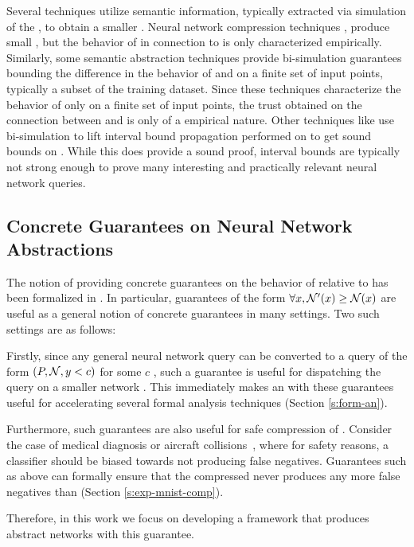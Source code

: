 Several techniques utilize semantic information, typically extracted via
simulation of the \dnn, to obtain a smaller \abs. 
Neural network compression techniques \cite{dnn-compression}, produce small
\abs, but the
behavior of \abs in connection to \cnc is only characterized empirically.
Similarly, some semantic abstraction techniques \cite{lin-comb-abs-jan} provide
bi-simulation guarantees bounding the difference in the behavior of \abs and
\cnc on a finite set of input points, typically a subset of the training
dataset. Since these techniques characterize the behavior of \abs only on a
finite set of
input points, the trust obtained on the connection between \cnc and \abs is only
of a empirical nature.
Other techniques like \cite{deep-abstract} use bi-simulation to lift
interval bound propagation performed on \abs to get sound bounds on \cnc. While
this does provide a sound proof, interval bounds are typically not strong enough
to prove many interesting and practically relevant neural network queries.

\subsection{Concrete Guarantees on Neural Network Abstractions}
\label{s:conc-abs}

The notion of providing concrete guarantees on the behavior of \abs relative to
\cnc has been formalized in \cite{cegar-nn}. In particular, guarantees of the
form $\forall x, \mathcal{N'}(x) \geq \mathcal{N}(x)$ are useful as a general notion of concrete
guarantees in many settings. Two such settings are as follows: 

Firstly, since any general neural network query can be converted to a query of
the form $(P, \mathcal{N}, y < c)$ for some $c$
\cite{cegar-nn,reluplex,lipschitz-reach}, such a guarantee is
useful for dispatching the query on a smaller network
\cite{cegar-nn,cegarette,cleverest-nn}. This immediately makes an \abs with
these guarantees useful for
accelerating several formal analysis techniques (Section \ref{s:form-an}).

Furthermore, such guarantees are also useful for safe compression of \dnn.
Consider the case of medical diagnosis \cite{b1} or aircraft
collisions~\cite{acasxu}, where
for safety reasons, a classifier should be biased towards not producing false
negatives. Guarantees such as above can formally ensure that the compressed \abs
never produces any more false negatives than \cnc (Section
\ref{s:exp-mnist-comp}).

Therefore, in this work we focus on developing a framework that produces
abstract networks with this guarantee.

